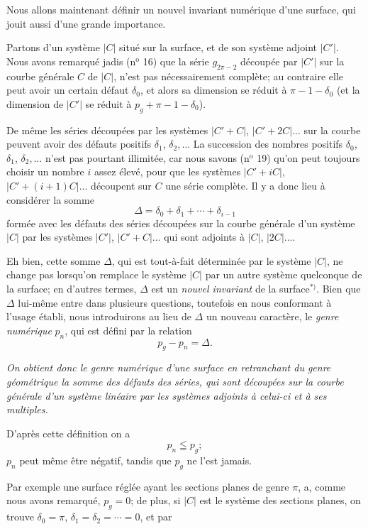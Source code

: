 \documentclass{article}
\begin{document}
Nous allons maintenant définir un nouvel invariant numérique d'une surface, qui jouit aussi d'une grande importance.

Partons d'un système $|C|$ situé sur la surface, et de son système adjoint $|C'|$. Nous avons remarqué jadis (n${}^{\text{o}}$ 16) que la série $g_{2\pi-2}$ découpée par $|C'|$ sur la courbe générale $C$ de $|C|$, n'est pas nécessairement complète; au contraire elle peut avoir un certain défaut $\delta_{0}$, et alors sa dimension se réduit à $\pi - 1 - \delta_{0}$ (et la dimension de $|C'|$ se réduit à $p_{g} + \pi - 1 - \delta_{0}$).

De même les séries découpées par les systèmes $|C' + C|$, $|C' + 2C| \ldots$ sur la courbe peuvent avoir des défauts positifs $\delta_{1}$, $\delta_{2}, \ldots$ La succession des nombres positifs $\delta_{0}$, $\delta_{1}$, $\delta_{2}, \ldots$ n'est pas pourtant illimitée, car nous savons (n${}^{\text{o}}$ 19) qu'on peut toujours choisir un nombre $i$ assez élevé, pour que les systèmes $|C' + iC|$, $|C' + (i+1)C| \ldots$ découpent sur $C$ une série complète. Il y a donc lieu à considérer la somme
\[
\Delta = \delta_{0} + \delta_{1} + \cdots + \delta_{i-1}
\]
formée avec les défauts des séries découpées sur la courbe générale d'un système $|C|$ par les systèmes $|C'|$, $|C' + C| \ldots$ qui sont adjoints à $|C|$, $|2C| \ldots$.

Eh bien, cette somme $\Delta$, qui est tout-à-fait déterminée par le système $|C|$, ne change pas lorsqu'on remplace le système $|C|$ par un autre système quelconque de la surface; en d'autres termes, $\Delta$ est un \emph{nouvel invariant} de la surface${}^{*)}$. Bien que $\Delta$ lui-même entre dans plusieurs questions, toutefois en nous conformant à l'usage établi, nous introduirons au lieu de $\Delta$ un nouveau caractère, le \emph{genre numérique} $p_{n}$, qui est défini par la relation
\[
p_{g} - p_{n} = \Delta.
\]

\emph{On obtient donc le genre numérique d'une surface en retranchant du genre géométrique la somme des défauts des séries, qui sont découpées sur la courbe générale d'un système linéaire par les systèmes adjoints à celui-ci et à ses multiples.}

D'après cette définition on a
\[
p_{n} \leqq p_{g};
\]
$p_{n}$ peut même être négatif, tandis que $p_{g}$ ne l'est jamais.

Par exemple une surface réglée ayant les sections planes de genre $\pi$, a, comme nous avons remarqué, $p_{g} = 0$; de plus, si $|C|$ est le système des sections planes, on trouve $\delta_{0} = \pi$, $\delta_{1} = \delta_{2} = \cdots = 0$, et par
\end{document}
